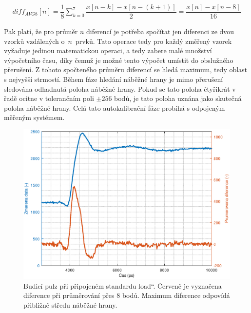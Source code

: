 \begin{equation}
\begin{gathered}
	diff_{AVG8}[n]= \dfrac{1}{8} \sum_{k=0}^7 \dfrac{x[n-k]-x[n-(k+1)]}{2}= \dfrac{x[n]-x[n-8]}{16}
\end{gathered}
\label{equation_difference_sum}
\end{equation}

Pak platí, že pro průměr $n$ diferencí je potřeba spočítat jen diferenci ze dvou vzorků vzdálených o~$n$~prvků. Tato operace tedy pro každý změřený vzorek vyžaduje jedinou matematickou operaci, a tedy zabere malé množství výpočetního času, díky čemuž je možné tento výpočet umístit do obslužného přerušení. Z tohoto spočteného průměru diferencí se hledá maximum, tedy oblast s nejvyšší strmostí. Během fáze hledání náběžné hrany je mimo přerušení sledována odhadnutá poloha náběžné hrany. Pokud se tato poloha čtyřikrát v řadě ocitne v tolerančním poli $\pm256$ bodů, je tato poloha uznána jako skutečná poloha náběžné hrany. Celá tato autokalibrační fáze probíhá s odpojeným měřeným systémem.

\begin{figure}[htbp]
\includegraphics[width=\textwidth,keepaspectratio]{images/rising_edge_port_load.eps}\caption{Budicí pulz při připojeném standardu \quotedblbase load\textquotedblleft . Červeně je vyznačena diference při průměrování přes 8 bodů. Maximum diference odpovídá přibližně středu náběžné hrany.}\label{rising_edge_port_load}
\end{figure}

